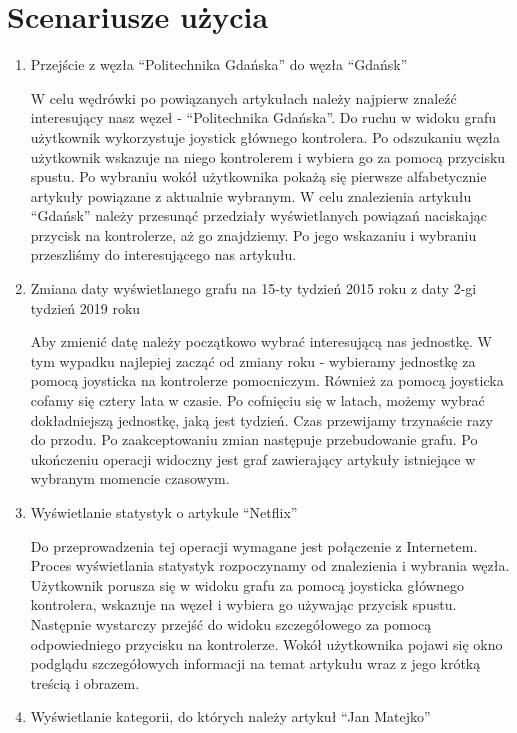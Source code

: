 \section{Scenariusze użycia}
\begin{enumerate}
\item Przejście z węzła ``Politechnika Gdańska'' do węzła ``Gdańsk''

	W celu wędrówki po powiązanych artykułach należy najpierw znaleźć interesujący nasz węzeł - ``Politechnika Gdańska''. Do ruchu w widoku grafu użytkownik wykorzystuje joystick głównego kontrolera. Po odszukaniu węzła użytkownik wskazuje na niego kontrolerem i wybiera go za pomocą przycisku spustu. Po wybraniu wokół użytkownika pokażą się pierwsze alfabetycznie artykuły powiązane z aktualnie wybranym. W celu znalezienia artykułu ``Gdańsk'' należy przesunąć przedziały wyświetlanych powiązań naciskając przycisk na kontrolerze, aż go znajdziemy. Po jego wskazaniu i wybraniu przeszliśmy do interesującego nas artykułu.
	
\item Zmiana daty wyświetlanego grafu na 15-ty tydzień  2015 roku z daty 2-gi tydzień 2019 roku

	Aby zmienić datę należy początkowo wybrać interesującą nas jednostkę. W tym wypadku najlepiej zacząć od zmiany roku - wybieramy jednostkę za pomocą joysticka na kontrolerze pomocniczym. Również za pomocą joysticka cofamy się cztery lata w czasie. Po cofnięciu się w latach, możemy wybrać dokładniejszą jednostkę, jaką jest tydzień. Czas przewijamy trzynaście razy do przodu. Po zaakceptowaniu zmian następuje przebudowanie grafu. Po ukończeniu operacji widoczny jest graf zawierający artykuły istniejące w wybranym momencie czasowym.
	
\item Wyświetlanie statystyk o artykule ``Netflix''

	Do przeprowadzenia tej operacji wymagane jest połączenie z Internetem. Proces wyświetlania statystyk rozpoczynamy od znalezienia i wybrania węzła. Użytkownik porusza się w widoku grafu za pomocą joysticka głównego kontrolera, wskazuje na węzeł i wybiera go używając przycisk spustu. Następnie wystarczy przejść do widoku szczegółowego za pomocą odpowiedniego przycisku na kontrolerze. Wokół użytkownika pojawi się okno podglądu szczegółowych informacji na temat artykułu wraz z jego krótką treścią i obrazem.
	
\item Wyświetlanie kategorii, do których należy artykuł ``Jan Matejko''


\end{enumerate}
